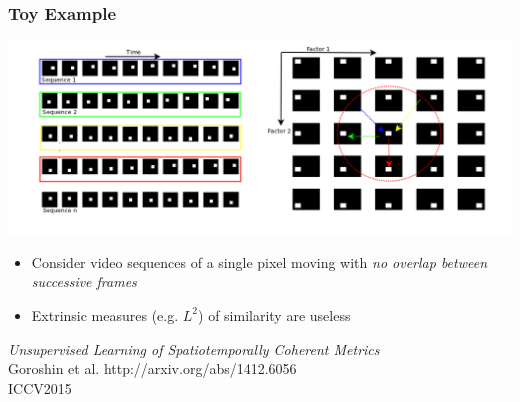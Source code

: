 \documentclass{beamer}
\begin{document}
\begin{frame} 
\frametitle{Toy Example}
\begin{center} 
\includegraphics[scale=0.25]{./Figures/toy_video.png}
\end{center} 
\begin{itemize} 
\item{Consider video sequences of a single pixel moving with \emph{no overlap between successive frames}}
\item{Extrinsic measures (e.g. $L^2$) of similarity are useless}
\end{itemize} 
\end{frame} 

\begin{frame}
\begin{center} 
\huge \color{blue} \emph{Unsupervised Learning of Spatiotemporally Coherent Metrics}
\\ \vspace{2.5cm} 
\small{Goroshin et al. http://arxiv.org/abs/1412.6056 \\ ICCV2015}
\end{center} 
\end{frame}
\end{document}
